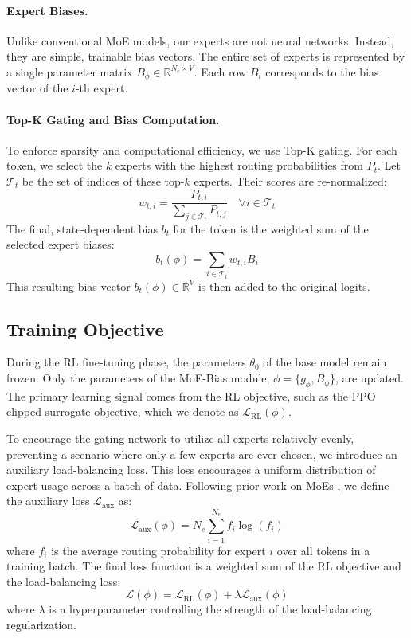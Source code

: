 \documentclass[a4paper]{article}
\begin{document}
\paragraph{Expert Biases.}
Unlike conventional MoE models, our experts are not neural networks. Instead, they are simple, trainable bias vectors. The entire set of experts is represented by a single parameter matrix $B_\phi \in \mathbb{R}^{N_e \times V}$. Each row $B_i$ corresponds to the bias vector of the $i$-th expert.

\paragraph{Top-K Gating and Bias Computation.}
To enforce sparsity and computational efficiency, we use Top-K gating. For each token, we select the $k$ experts with the highest routing probabilities from $P_t$. Let $\mathcal{T}_t$ be the set of indices of these top-$k$ experts. Their scores are re-normalized:
\begin{equation}
    w_{t,i} = \frac{P_{t,i}}{\sum_{j \in \mathcal{T}_t} P_{t,j}} \quad \forall i \in \mathcal{T}_t
\end{equation}
The final, state-dependent bias $b_t$ for the token is the weighted sum of the selected expert biases:
\begin{equation}
    b_t(\phi) = \sum_{i \in \mathcal{T}_t} w_{t,i} B_i
\end{equation}
This resulting bias vector $b_t(\phi) \in \mathbb{R}^{V}$ is then added to the original logits.

\subsection{Training Objective}
During the RL fine-tuning phase, the parameters $\theta_0$ of the base model remain frozen. Only the parameters of the MoE-Bias module, $\phi = \{g_\phi, B_\phi\}$, are updated. The primary learning signal comes from the RL objective, such as the PPO clipped surrogate objective, which we denote as $\mathcal{L}_{\text{RL}}(\phi)$.

To encourage the gating network to utilize all experts relatively evenly, preventing a scenario where only a few experts are ever chosen, we introduce an auxiliary load-balancing loss. This loss encourages a uniform distribution of expert usage across a batch of data. Following prior work on MoEs \cite{...}, %
we define the auxiliary loss $\mathcal{L}_{\text{aux}}$ as:
\begin{equation}
    \mathcal{L}_{\text{aux}}(\phi) = N_e \sum_{i=1}^{N_e} f_i \log(f_i)
\end{equation}
where $f_i$ is the average routing probability for expert $i$ over all tokens in a training batch. The final loss function is a weighted sum of the RL objective and the load-balancing loss:
\begin{equation}
    \mathcal{L}(\phi) = \mathcal{L}_{\text{RL}}(\phi) + \lambda \mathcal{L}_{\text{aux}}(\phi)
\end{equation}
where $\lambda$ is a hyperparameter controlling the strength of the load-balancing regularization. %
\end{document}
